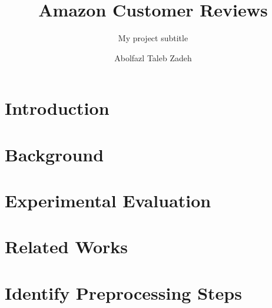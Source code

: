 \documentclass[sigconf]{acmart}
\begin{document}
\title{Amazon Customer Reviews}
\subtitle{My project subtitle}

\author{Abolfazl Taleb Zadeh}




\begin{abstract}

\end{abstract}


\maketitle


\section{Introduction}
\label{sec:introduction}


\section{Background}
\label{sec:background}


\section{Experimental Evaluation}
\label{sec:evaluation}


\section{Related Works}
\label{sec:relatedWorks}


\section{Identify Preprocessing Steps}
\label{sec:preprocessing}

\end{document}
